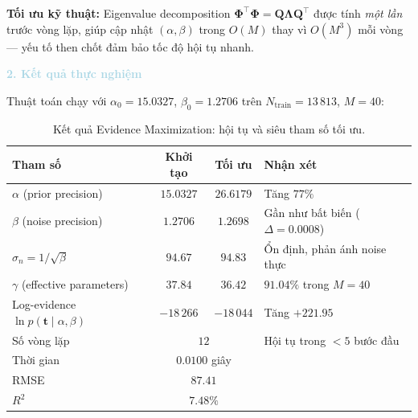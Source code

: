 \textbf{Tối ưu kỹ thuật:} Eigenvalue decomposition
$\boldsymbol{\Phi}^\top\boldsymbol{\Phi} = \mathbf{Q}\boldsymbol{\Lambda}\mathbf{Q}^\top$
được tính \textit{một lần} trước vòng lặp, giúp cập nhật $(\alpha, \beta)$
trong $O(M)$ thay vì $O(M^3)$ mỗi vòng --- yếu tố then chốt đảm bảo tốc độ hội tụ nhanh.

\noindent\textcolor{lightblue}{\textbf{2. Kết quả thực nghiệm}}

Thuật toán chạy với $\alpha_0 = 15.0327$, $\beta_0 = 1.2706$ trên
$N_\text{train} = 13\,813$, $M = 40$:

\begin{table}[H]
\centering
\caption{Kết quả Evidence Maximization: hội tụ và siêu tham số tối ưu.}
\label{tab:em_results}
\renewcommand{\arraystretch}{1.4}
\begin{tabular}{l c c l}
  \toprule
  \textbf{Tham số} & \textbf{Khởi tạo} & \textbf{Tối ưu} & \textbf{Nhận xét} \\
  \midrule
  $\alpha$ (prior precision)          & $15.0327$ & $26.6179$ & Tăng $77\%$ \\
  $\beta$ (noise precision)           & $1.2706$  & $1.2698$  & Gần như bất biến ($\Delta = 0.0008$) \\
  $\sigma_n = 1/\sqrt{\beta}$     & $94.67$   & $94.83$   & Ổn định, phản ánh noise thực \\
  $\gamma$ (effective parameters)     & $37.84$   & $36.42$   & $91.04\%$ trong $M=40$ \\
  Log-evidence $\ln p(\boldsymbol{t}\mid\alpha,\beta)$ & $-18\,266$ & $-18\,044$ & Tăng $+221.95$ \\
  Số vòng lặp                         & \multicolumn{2}{c}{$12$} & Hội tụ trong $<5$ bước đầu \\
  Thời gian                           & \multicolumn{2}{c}{$0.0100$ giây} & \\[3pt]
  \midrule
  RMSE                     & \multicolumn{2}{c}{$87.41$} & \\
  $R^2$                        & \multicolumn{2}{c}{$7.48\%$} & \\
  \bottomrule
\end{tabular}
\end{table}

